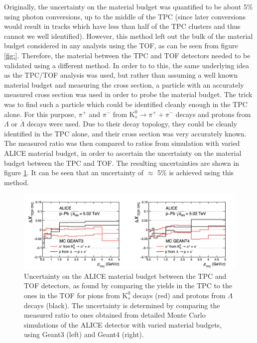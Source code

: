 Originally, the uncertainty on the material budget was quantified to be about 5\% using photon conversions\cite{}, up to the middle of the TPC (since later conversions would result in tracks which have less than half of the TPC clusters and thus cannot we well identified). However, this method left out the bulk of the material budget considered in any analysis using the TOF, as can be seen from figure \ref{fig:}. Therefore, the material between the TPC and TOF detectors needed to be validated using a different method. In order to to this, the same underlying idea as the TPC/TOF analysis was used, but rather than assuming a well known material budget and measuring the cross section, a particle with an accurately measured cross section was used in order to probe the material budget. The trick was to find such a particle which could be identified cleanly enough in the TPC alone. For this purpose, $\pi^+$ and $\pi^-$ from $\mathrm{K}_s^0 \rightarrow \pi^+ + \pi^-$ decays and protons from $\Lambda$ or $\overline{\Lambda}$ decays were used\cite{ALICE-PUBLIC-2022-002}. Due to their decay topology, they could be cleanly identified in the TPC alone, and their cross section was very accurately known. The measured ratio was then compared to ratios from simulation with varied ALICE material budget, in order to ascertain the uncertainty on the material budget between the TPC and TOF. The resulting uncertainties are shown in figure \ref{fig:ALICE_mat_budget}. It can be seen that an uncertainty of $\approx$ 5\% is achieved using this method. \\

\begin{figure}[bthp]
    \centering
    \includegraphics[width=\textwidth]{figures/ALICE_material_budget_tests.png}
    \caption{Uncertainty on the ALICE material budget between the TPC and TOF detectors, as found by comparing the yields in the TPC to the ones in the TOF for pions from $\mathrm{K}_s^0$ decays (red) and protons from $\Lambda$ decays (black). The uncertainty is determined by comparing the measured ratio to ones obtained from detailed Monte Carlo simulations of the ALICE detector with varied material budgets, using Geant3 (left) and Geant4 (right).}
    \label{fig:ALICE_mat_budget}
\end{figure}

